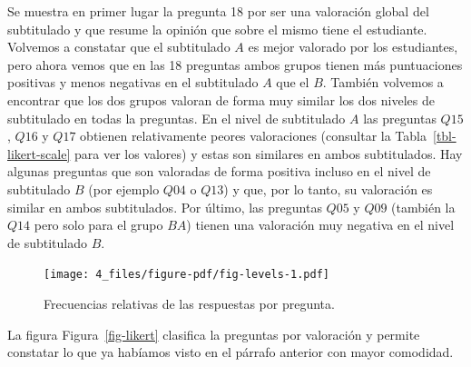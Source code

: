 \documentclass[
  12pt,
  a4paper,
  extrafontsizes,
  onecolumn,
  openright]{memoir}
\begin{document}
Se muestra en primer lugar la pregunta 18 por ser una valoración global
del subtitulado y que resume la opinión que sobre el mismo tiene el
estudiante. Volvemos a constatar que el subtitulado \(A\) es mejor
valorado por los estudiantes, pero ahora vemos que en las 18 preguntas
ambos grupos tienen más puntuaciones positivas y menos negativas en el
subtitulado \(A\) que el \(B\). También volvemos a encontrar que los dos
grupos valoran de forma muy similar los dos niveles de subtitulado en
todas la preguntas. En el nivel de subtitulado \(A\) las preguntas
\(Q15\), \(Q16\) y \(Q17\) obtienen relativamente peores valoraciones
(consultar la Tabla~\ref{tbl-likert-scale} para ver los valores) y estas
son similares en ambos subtitulados. Hay algunas preguntas que son
valoradas de forma positiva incluso en el nivel de subtitulado \(B\)
(por ejemplo \(Q04\) o \(Q13\)) y que, por lo tanto, su valoración es
similar en ambos subtitulados. Por último, las preguntas \(Q05\) y
\(Q09\) (también la \(Q14\) pero solo para el grupo \(BA\)) tienen una
valoración muy negativa en el nivel de subtitulado \(B\).

\begin{figure}[h]

{\centering \texttt{[image: 4\_files/figure-pdf/fig-levels-1.pdf]}

}

\caption{\label{fig-levels}Frecuencias relativas de las respuestas por
pregunta.}

\end{figure}

La figura Figura~\ref{fig-likert} clasifica la preguntas por valoración
y permite constatar lo que ya habíamos visto en el párrafo anterior con
mayor comodidad.
\end{document}
